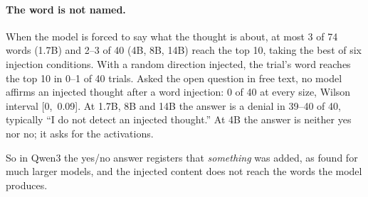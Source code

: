 \documentclass[11pt]{article}
\begin{document}
\paragraph{The word is not named.} When the model is forced to say what the thought is about, at most 3 of 74 words (1.7B) and 2--3 of 40 (4B, 8B, 14B) reach the top 10, taking the best of six injection conditions. With a random direction injected, the trial's word reaches the top 10 in 0--1 of 40 trials. Asked the open question in free text, no model affirms an injected thought after a word injection: 0 of 40 at every size, Wilson interval [0,~0.09]. At 1.7B, 8B and 14B the answer is a denial in 39--40 of 40, typically ``I do not detect an injected thought.'' At 4B the answer is neither yes nor no; it asks for the activations.

So in Qwen3 the yes/no answer registers that \emph{something} was added, as \citet{lederman2026content} found for much larger models, and the injected content does not reach the words the model produces.
\end{document}
